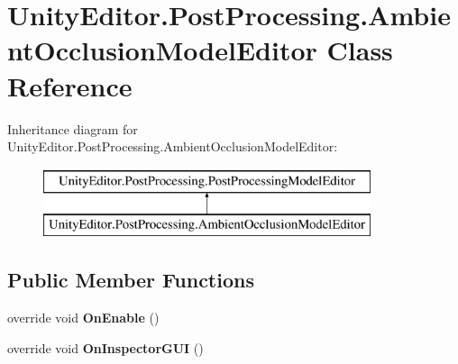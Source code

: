 \hypertarget{class_unity_editor_1_1_post_processing_1_1_ambient_occlusion_model_editor}{}\section{Unity\+Editor.\+Post\+Processing.\+Ambient\+Occlusion\+Model\+Editor Class Reference}
\label{class_unity_editor_1_1_post_processing_1_1_ambient_occlusion_model_editor}
Inheritance diagram for Unity\+Editor.\+Post\+Processing.\+Ambient\+Occlusion\+Model\+Editor\+:\begin{figure}[H]
\begin{center}
\leavevmode
\includegraphics[height=2.000000cm]{class_unity_editor_1_1_post_processing_1_1_ambient_occlusion_model_editor}
\end{center}
\end{figure}
\subsection*{Public Member Functions}
\begin{DoxyCompactItemize}
\item 
\mbox{\label{class_unity_editor_1_1_post_processing_1_1_ambient_occlusion_model_editor_a7985bbb79187976b1e90cdb401800e2f}} 
override void {\bfseries On\+Enable} ()
\item 
\mbox{\label{class_unity_editor_1_1_post_processing_1_1_ambient_occlusion_model_editor_a088ca4292c297130b6d86b22357c1c41}} 
override void {\bfseries On\+Inspector\+G\+UI} ()
\end{DoxyCompactItemize}
